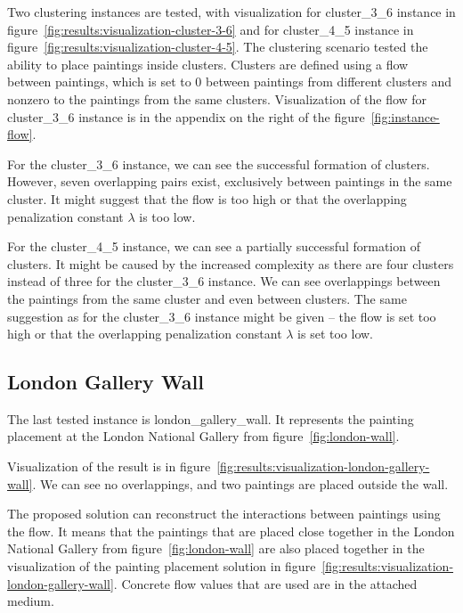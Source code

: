 Two clustering instances are tested, with visualization for cluster\_3\_6 instance
in figure~\ref{fig:results:visualization-cluster-3-6} and for cluster\_4\_5 instance in figure~\ref{fig:results:visualization-cluster-4-5}.
The clustering scenario tested the ability to place paintings inside clusters.
Clusters are defined using a flow between paintings, which is set to 0 between paintings from different
clusters and nonzero to the paintings from the same clusters.
Visualization of the flow for cluster\_3\_6 instance is in the appendix on the right of the figure~\ref{fig:instance-flow}.

For the cluster\_3\_6 instance, we can see the successful formation of clusters.
However, seven overlapping pairs exist, exclusively between paintings in the same cluster.
It might suggest that the flow is too high or that the overlapping penalization constant $\lambda$ is too low.


For the cluster\_4\_5 instance, we can see a partially successful formation of clusters.
It might be caused by the increased complexity as there are four clusters instead of three for the cluster\_3\_6 instance.
We can see overlappings between the paintings from the same cluster and even between clusters.
The same suggestion as for the cluster\_3\_6 instance might be given – the flow is set too high or that the overlapping penalization constant $\lambda$ is set too low.

\subsection{London Gallery Wall}\label{subsec:london-gallery-wall}

The last tested instance is london\_gallery\_wall.
It represents the painting placement at the London National Gallery from figure~\ref{fig:london-wall}.

Visualization of the result is in figure~\ref{fig:results:visualization-london-gallery-wall}.
We can see no overlappings, and two paintings are placed outside the wall.

The proposed solution can reconstruct the interactions between paintings using the flow.
It means that the paintings that are placed close together in the London National Gallery from figure~\ref{fig:london-wall}
are also placed together in the visualization of the painting placement solution in figure~\ref{fig:results:visualization-london-gallery-wall}.
Concrete flow values that are used are in the attached medium.


